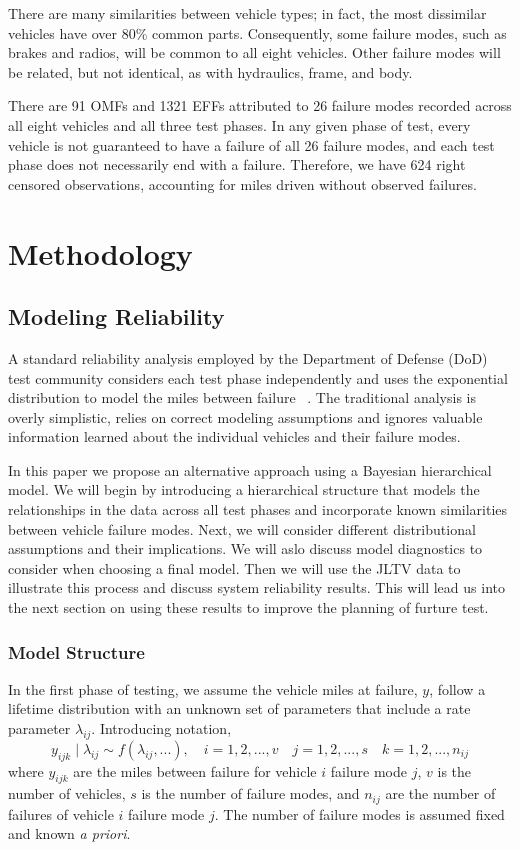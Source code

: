 \documentclass[12pt]{article}
\begin{document}
There are many similarities between vehicle types; in fact, the most dissimilar
vehicles have over 80\% common parts. Consequently, some failure modes, such as
brakes and radios, will be common to all eight vehicles. Other failure modes
will be related, but not identical, as with hydraulics, frame, and body.

There are 91 OMFs and 1321 EFFs attributed to 26 failure modes recorded across
all eight vehicles and all three test phases. In any given phase of test, every
vehicle is not guaranteed to have a failure of all 26 failure modes, and each
test phase does not necessarily end with a failure. Therefore, we have 624 right
censored observations, accounting for miles driven without observed failures.

\section{Methodology}

\subsection{Modeling Reliability}
A standard reliability analysis employed by the Department of Defense (DoD) test
community considers each test phase independently and uses the exponential
distribution to model the miles between failure ~\cite{ref1}. The traditional
analysis is overly simplistic, relies on correct modeling assumptions
and ignores valuable information learned about the individual vehicles and their
failure modes.

In this paper we propose an alternative approach using a Bayesian hierarchical
model.  We will begin by introducing a hierarchical structure that models the
relationships in the data across all test phases and incorporate known
similarities between vehicle failure modes.  Next, we will consider different
distributional assumptions and their implications.  We will aslo
discuss model diagnostics to consider when choosing a final model. Then we will
use the JLTV data to illustrate this process and discuss system reliability
results. This will lead us into the next section on using these results to
improve the planning of furture test.

\subsubsection{Model Structure}
In the first phase of testing, we assume the vehicle miles at failure, $y$,
follow a lifetime distribution with an unknown set of parameters that include
a rate parameter $\lambda_{ij}$.
Introducing notation,
\begin{equation}
y_{ijk}\mid\lambda_{ij}\sim f(\lambda_{ij},...), \quad i = 1,2,...,v \quad
j=1,2,...,s \quad k=1,2,...,n_{ij}
\end{equation}
where $y_{ijk}$ are the miles between failure for vehicle $i$ failure mode $j$,
$v$ is the number of vehicles, $s$ is the number of failure modes, and $n_{ij}$
are the number of failures of vehicle $i$ failure mode $j$. The number of
failure modes is assumed fixed and known \textit{a priori}.
\end{document}
